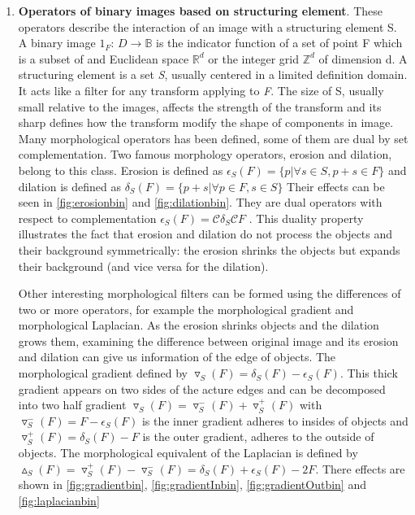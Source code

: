 \begin{enumerate}
\item \textbf{Operators of binary images based on structuring element}. These operators describe the interaction of an image with a structuring element S. A binary image $1_F$: $ D \rightarrow \mathbb{B} $ is the indicator function of a set of point F which is a subset of and Euclidean space $ \mathbb{R}^d $ or the integer grid $\mathbb{Z}^d$ of dimension d. A structuring element is a set \textit{S}, usually centered in a limited definition domain. It acts like a filter for any transform applying to \textit{F}. The size of S, usually small relative to the images, affects the strength of the transform and its sharp defines how the transform modify the shape of components in image. Many morphological operators has been defined, some of them are dual by set complementation. Two famous morphology operators, erosion and dilation, belong to this class. Erosion is defined as $ \epsilon_S (F) = \lbrace p  \vert  \forall s \in S, p + s \in F\rbrace $  and dilation is defined as $ \delta_S (F) = \lbrace p+s  \vert  \forall p \in F, s \in S\rbrace $ Their effects can be seen in \ref{fig:erosionbin} and \ref{fig:dilationbin}. They are dual operators with respect to complementation $ \epsilon_S (F) = \mathcal{C} {\delta_{S}\mathcal{C}F} $ . This duality property illustrates the fact that erosion and dilation do not process the objects and their background symmetrically: the erosion shrinks the objects but expands their background (and vice versa for the dilation).
\par Other interesting morphological filters can be formed using the differences of two or more operators, for example the morphological gradient and morphological Laplacian. As the erosion shrinks objects and the dilation grows them, examining the difference between original image and its erosion and dilation can give us information of the edge of objects. The morphological gradient defined by $\triangledown_S (F) = \delta_S (F) - \epsilon_S (F) $. This thick gradient appears on two sides of the acture edges and can be decomposed into two half gradient $\triangledown_S (F) = \triangledown_S ^- (F) + \triangledown_S ^+ (F)$ with $ \triangledown_S ^- (F) = F - \epsilon_S (F)$ is the inner gradient adheres to insides of objects and $ \triangledown_S ^+ (F) =\delta_S (F) - F$ is the outer gradient, adheres to the outside of objects. The morphological equivalent of the Laplacian is defined by $\vartriangle_S (F) =\triangledown_S ^+ (F) - \triangledown_S ^- (F)=\delta_S (F)+\epsilon_S (F) - 2F$. There effects are shown in \ref{fig:gradientbin}, \ref{fig:gradientInbin}, \ref{fig:gradientOutbin} and \ref{fig:laplacianbin}


\end{enumerate}
